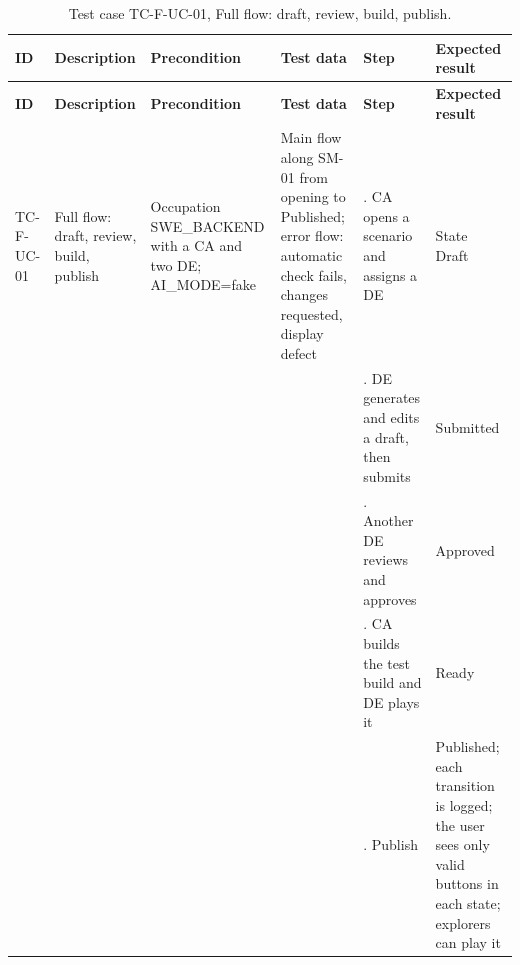 {\footnotesize{}\renewcommand{\arraystretch}{1.1}
\begin{longtable}{|>{\raggedright\arraybackslash}p{}|>{\raggedright\arraybackslash}p{}|>{\raggedright\arraybackslash}p{}|>{\raggedright\arraybackslash}p{}|>{\raggedright\arraybackslash}p{}|>{\raggedright\arraybackslash}p{}|}
\caption{Test case TC-F-UC-01, Full flow: draft, review, build, publish.} \\
\hline
\textbf{ID} & \textbf{Description} & \textbf{Precondition} & \textbf{Test data} & \textbf{Step} & \textbf{Expected result} \\ \hline
\endfirsthead
\hline
\textbf{ID} & \textbf{Description} & \textbf{Precondition} & \textbf{Test data} & \textbf{Step} & \textbf{Expected result} \\ \hline
\endhead
TC-F-UC-01 & Full flow: draft, review, build, publish & Occupation SWE\_BACKEND with a CA and two DE; AI\_\allowbreak{}MODE=fake & Main flow along SM-01 from opening to Published; error flow: automatic check fails, changes requested, display defect & 1. CA opens a scenario and assigns a DE & State Draft \\ \cline{5-6}
 &  &  &  & 2. DE generates and edits a draft, then submits & Submitted \\ \cline{5-6}
 &  &  &  & 3. Another DE reviews and approves & Approved \\ \cline{5-6}
 &  &  &  & 4. CA builds the test build and DE plays it & Ready \\ \cline{5-6}
 &  &  &  & 5. Publish & Published; each transition is logged; the user sees only valid buttons in each state; explorers can play it \\ \hline
\end{longtable}
}

